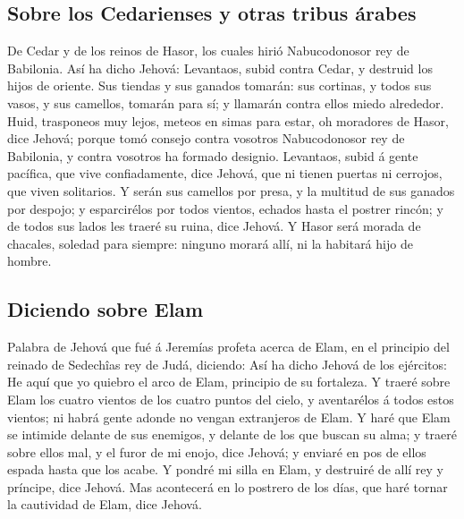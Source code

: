 \hypertarget{sobre-los-cedarienses-y-otras-tribus-uxe1rabes}{%
\subsection{Sobre los Cedarienses y otras tribus
árabes}\label{sobre-los-cedarienses-y-otras-tribus-uxe1rabes}}

 De Cedar y de los reinos de Hasor, los cuales hirió
Nabucodonosor rey de Babilonia. Así ha dicho Jehová: Levantaos, subid
contra Cedar, y destruid los hijos de oriente.  Sus tiendas
y sus ganados tomarán: sus cortinas, y todos sus vasos, y sus camellos,
tomarán para sí; y llamarán contra ellos miedo alrededor. 
Huid, trasponeos muy lejos, meteos en simas para estar, oh moradores de
Hasor, dice Jehová; porque tomó consejo contra vosotros Nabucodonosor
rey de Babilonia, y contra vosotros ha formado designio. 
Levantaos, subid á gente pacífica, que vive confiadamente, dice Jehová,
que ni tienen puertas ni cerrojos, que viven solitarios.  Y
serán sus camellos por presa, y la multitud de sus ganados por despojo;
y esparcirélos por todos vientos, echados hasta el postrer rincón; y de
todos sus lados les traeré su ruina, dice Jehová.  Y Hasor
será morada de chacales, soledad para siempre: ninguno morará allí, ni
la habitará hijo de hombre.

\hypertarget{diciendo-sobre-elam}{%
\subsection{Diciendo sobre Elam}\label{diciendo-sobre-elam}}

 Palabra de Jehová que fué á Jeremías profeta acerca de
Elam, en el principio del reinado de Sedechîas rey de Judá, diciendo:
 Así ha dicho Jehová de los ejércitos: He aquí que yo
quiebro el arco de Elam, principio de su fortaleza.  Y
traeré sobre Elam los cuatro vientos de los cuatro puntos del cielo, y
aventarélos á todos estos vientos; ni habrá gente adonde no vengan
extranjeros de Elam.  Y haré que Elam se intimide delante
de sus enemigos, y delante de los que buscan su alma; y traeré sobre
ellos mal, y el furor de mi enojo, dice Jehová; y enviaré en pos de
ellos espada hasta que los acabe.  Y pondré mi silla en
Elam, y destruiré de allí rey y príncipe, dice Jehová.  Mas
acontecerá en lo postrero de los días, que haré tornar la cautividad de
Elam, dice Jehová.

